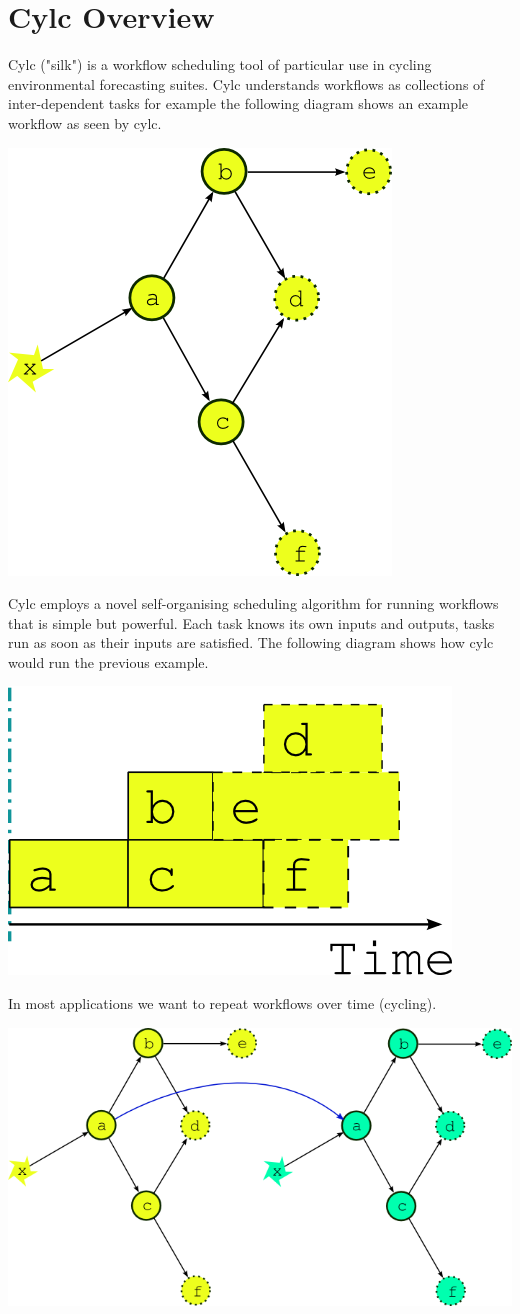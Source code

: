 \section{Cylc Overview}

Cylc ("silk") is a workflow scheduling tool of particular use in cycling
environmental forecasting suites. Cylc understands workflows as collections of
inter-dependent tasks for example the following diagram shows an example
workflow as seen by cylc.

\begin{center}
    \includegraphics[width=0.4\columnwidth]{resources/tex/dep-one-cycle}
\end{center}
Cylc employs a novel self-organising scheduling algorithm for running
workflows that is simple but powerful. Each task knows its own
inputs and outputs, tasks run as soon as their inputs are satisfied. The
following diagram shows how cylc would run the previous example.

\begin{center}
    \includegraphics[width=0.3\columnwidth]{resources/tex/timeline-zero.png}
\end{center}

In most applications we want to repeat workflows over time (cycling).

\begin{center}
    \includegraphics[width=0.5\columnwidth]{resources/tex/dep-two-cycles-linked}
\end{center}

